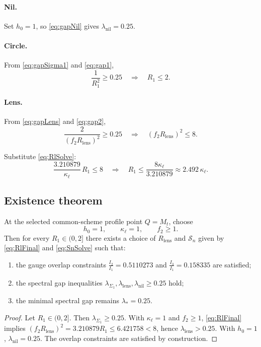 \documentclass[11pt]{article}
\begin{document}
\paragraph{Nil.}
Set $h_0=1$, so \eqref{eq:gapNil} gives $\lambda_{\mathrm{nil}}=0.25$.

\paragraph{Circle.}
From \eqref{eq:gapSigma1} and \eqref{eq:gap1},
\[
\frac{1}{R_1^2}\ge 0.25
\quad\Rightarrow\quad
R_1\le 2.
\]

\paragraph{Lens.}
From \eqref{eq:gapLens} and \eqref{eq:gap2},
\[
\frac{2}{(f_2R_{\mathrm{lens}})^2}\ge 0.25
\quad\Rightarrow\quad
(f_2R_{\mathrm{lens}})^2\le 8.
\]

Substitute \eqref{eq:RlSolve}:
\[
\frac{3.210879}{\kappa_\ell}\,R_1 \le 8
\quad\Rightarrow\quad
R_1 \le \frac{8\kappa_\ell}{3.210879}\approx 2.492\,\kappa_\ell.
\]

\subsection{Existence theorem}

\begin{theorem}
At the selected common-scheme profile point $Q=M_t$, choose
\[
h_0=1,\qquad \kappa_\ell=1,\qquad f_2\ge 1.
\]
Then for every $R_1\in(0,2]$ there exists a choice of
$R_{\mathrm{lens}}$ and $\mathcal{S}_n$ given by
\eqref{eq:RlFinal} and \eqref{eq:SnSolve} such that:
\begin{enumerate}
\item the gauge overlap constraints
$\frac{I_2}{I_1}=0.5110273$ and $\frac{I_3}{I_1}=0.158335$
are satisfied;
\item the spectral gap inequalities
$\lambda_{\Sigma_1},\lambda_{\mathrm{lens}},\lambda_{\mathrm{nil}}\ge 0.25$
hold;
\item the minimal spectral gap remains $\lambda_{\ast}=0.25$.
\end{enumerate}
\end{theorem}

\begin{proof}
Let $R_1\in(0,2]$. Then $\lambda_{\Sigma_1}\ge 0.25$.
With $\kappa_\ell=1$ and $f_2\ge 1$, \eqref{eq:RlFinal} implies
$(f_2R_{\mathrm{lens}})^2=3.210879R_1\le 6.421758<8$, hence
$\lambda_{\mathrm{lens}}>0.25$.
With $h_0=1$, $\lambda_{\mathrm{nil}}=0.25$.
The overlap constraints are satisfied by construction.
\end{proof}
\end{document}
